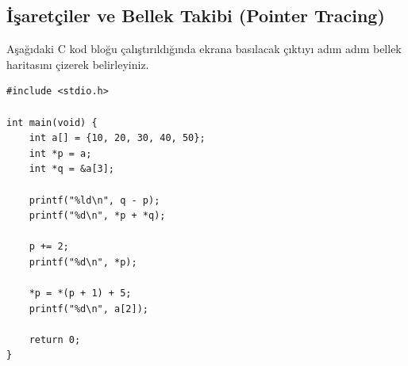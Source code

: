 \subsection{İşaretçiler ve Bellek Takibi (Pointer Tracing)}

\begin{example}
Aşağıdaki C kod bloğu çalıştırıldığında ekrana basılacak çıktıyı adım adım bellek haritasını çizerek belirleyiniz.

\begin{lstlisting}[language=CTemel]
#include <stdio.h>

int main(void) {
    int a[] = {10, 20, 30, 40, 50};
    int *p = a;
    int *q = &a[3];
    
    printf("%ld\n", q - p);
    printf("%d\n", *p + *q);
    
    p += 2;
    printf("%d\n", *p);
    
    *p = *(p + 1) + 5;
    printf("%d\n", a[2]);
    
    return 0;
}
\end{lstlisting}
\end{example}

